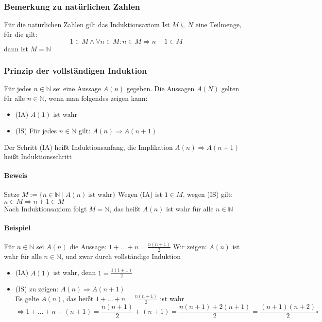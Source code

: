 \documentclass[a4paper]{scrartcl}
\DeclareMathOperator{\Forall}{\forall}
\theoremstyle{definition}
\theoremstyle{plain}
\theoremstyle{plain}
\theoremstyle{remark}
\theoremstyle{remark}
\theoremstyle{remark}
\begin{document}
\subsubsection{Bemerkung zu natürlichen Zahlen}
\label{sec-2-4-14}
Für die natürlichen Zahlen gilt das Induktionsaxiom
Ist $M\subseteq N$ eine Teilmenge, für die gilt:
\[1\in M \wedge \Forall n\in M : n\in M \Rightarrow n+1 \in M\]
dann ist $M = \mathbb{N}$
\subsubsection{Prinzip der vollständigen Induktion}
\label{sec-2-4-15}
Für jedes $n\in \mathbb{N}$ sei eine Aussage $A(n)$ gegeben. Die Aussagen $A(N)$ gelten für alle $n\in\mathbb{N}$, wenn man folgendes zeigen kann: \\
\begin{itemize}
\item (IA) $A(1)$ ist wahr
\item (IS) Für jedes $n\in\mathbb{N}$ gilt: $A(n) \Rightarrow A(n+1)$
\end{itemize}
Der Schritt (IA) heißt Induktionsanfang, die Implikation $A(n) \Rightarrow A(n+1)$ heißt Induktionsschritt
\paragraph{Beweis}
\label{sec-2-4-15-1}
Setze $M := \{n\in \mathbb{N}\mid A(n)~\text{ist wahr}\}$
Wegen (IA) ist $1\in M$, wegen (IS) gilt: $n\in M \Rightarrow n+1 \in M$ \\
     Nach Induktionsaxiom folgt $M = \mathbb{N}$, das heißt $A(n)$ ist wahr für alle $n\in \mathbb{N}$
\paragraph{Beispiel}
\label{sec-2-4-15-2}
Für $n\in\mathbb{N}$ sei $A(n)$ die Aussage: $1+\ldots + n = \frac{n(n+1)}{2}$
Wir zeigen: $A(n)$ ist wahr für alle $n\in \mathbb{N}$, und zwar durch vollständige Induktion
\begin{itemize}
\item (IA) $A(1)$ ist wahr, denn $1 = \frac{1(1+1)}{2}$
\item (IS) zu zeigen: $A(n) \Rightarrow A(n+1)$ \\
       Es gelte $A(n)$, das heißt $1+\ldots+n = \frac{n(n+1)}{2}$ ist wahr \[\Rightarrow 1 + \ldots + n + (n + 1) = \frac{n(n+1)}{2} + (n+1) =  \frac{n(n+1) + 2(n+1)}{2} = \frac{(n+1)(n+2)}{2} \square\]
\end{itemize}
\end{document}
